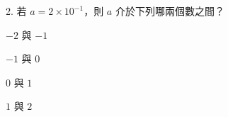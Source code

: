 \documentclass[12pt]{article}
\begin{document}
\begin{problem}
  \item[2.] 若 $a = 2 \times 10^{-1}$，則 $a$ 介於下列哪兩個數之間？
  \begin{choices}
    \item $-2$ 與 $-1$
    \item $-1$ 與 $0$
    \item $0$ 與 $1$
    \item $1$ 與 $2$
  \end{choices}
\end{problem}
\end{document}
